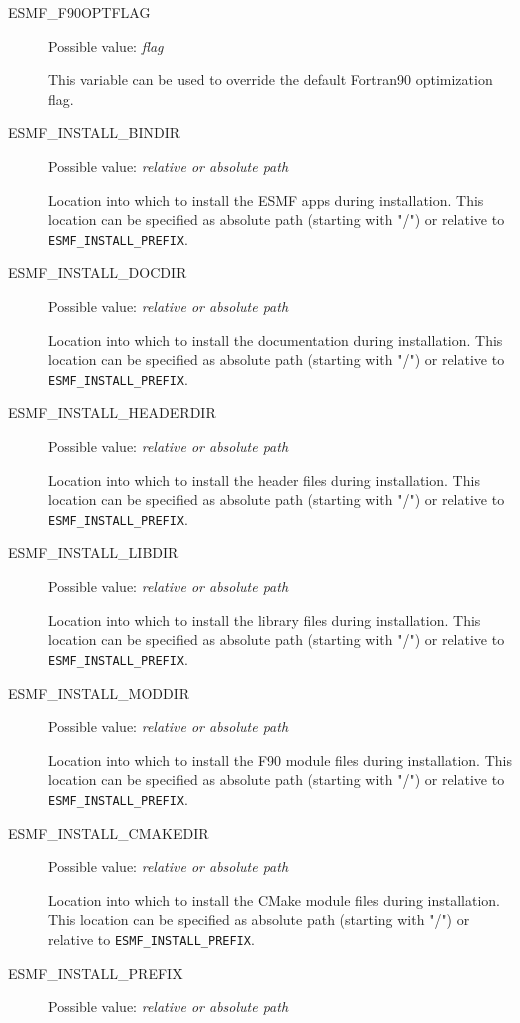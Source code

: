\begin{description}
\item[ESMF\_F90OPTFLAG]
Possible value: {\em flag}

This variable can be used to override the default  Fortran90 optimization flag.

\item[ESMF\_INSTALL\_BINDIR]
Possible value: {\em relative or absolute path}

Location into which to install the ESMF apps during installation. This
location can be specified as absolute path (starting with "/") or relative to
{\tt ESMF\_INSTALL\_PREFIX}.

\item[ESMF\_INSTALL\_DOCDIR]
Possible value: {\em relative or absolute path}

Location into which to install the documentation during installation. This
location can be specified as absolute path (starting with "/") or relative to
{\tt ESMF\_INSTALL\_PREFIX}.

\item[ESMF\_INSTALL\_HEADERDIR]
Possible value: {\em relative or absolute path}

Location into which to install the header files during installation. This
location can be specified as absolute path (starting with "/") or relative to
{\tt ESMF\_INSTALL\_PREFIX}.

\item[ESMF\_INSTALL\_LIBDIR]
Possible value: {\em relative or absolute path}

Location into which to install the library files during installation. This
location can be specified as absolute path (starting with "/") or relative to
{\tt ESMF\_INSTALL\_PREFIX}.

\item[ESMF\_INSTALL\_MODDIR]
Possible value: {\em relative or absolute path}

Location into which to install the F90 module files during installation. This
location can be specified as absolute path (starting with "/") or relative to
{\tt ESMF\_INSTALL\_PREFIX}.

\item[ESMF\_INSTALL\_CMAKEDIR]
Possible value: {\em relative or absolute path}

Location into which to install the CMake module files during installation. This
location can be specified as absolute path (starting with "/") or relative to
{\tt ESMF\_INSTALL\_PREFIX}.

\item[ESMF\_INSTALL\_PREFIX]
Possible value: {\em relative or absolute path}


\end{description}
